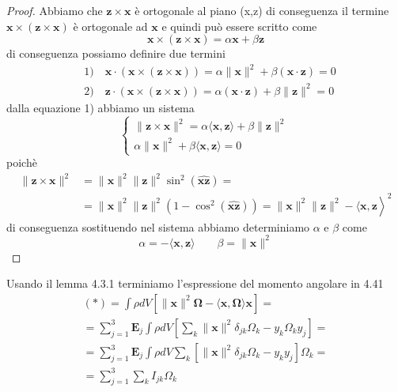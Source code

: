 \begin{proof}
	Abbiamo che $\bm{z} \times \bm{x}$ \`{e} ortogonale al piano (x,z) di conseguenza il termine $\bm{x} \times (\bm{z} \times \bm{x})$ \`{e} ortogonale ad $\bm{x}$ e quindi pu\`{o} essere scritto come 
	\begin{equation*}
	\bm{x} \times (\bm{z} \times \bm{x}) = \alpha \bm{x} + \beta \bm{z}	
	\end{equation*}
di conseguenza possiamo definire due termini 
\begin{equation*}
\begin{aligned}
& 1)\quad \bm{x} \cdot(\bm{x} \times (\bm{z} \times\bm{x}))  = \alpha\|\bm{x}\|^2+\beta(\bm{x} \cdot \bm{z})=0 \\[0.1in]
& 2)\quad \bm{z} \cdot(\bm{x} \times(\bm{z} \times\bm{x})) = \alpha(\bm{x} \cdot \bm{z})+\beta\|\bm{z}\|^2 = 0
\end{aligned}
\end{equation*}
dalla equazione 1) abbiamo un sistema 
\begin{equation*}
	\left \{ \begin{array}{l}
		\|\bm{z} \times \bm{x} \|^2 = \alpha \langle \bm{x},\bm{z}\rangle + \beta \|\bm{z}\|^2 \\[0.1in]
		\alpha \|\bm{x}\|^2 + \beta \langle \bm{x},\bm{z} \rangle = 0
	\end{array} \right.
\end{equation*}
poich\`{e} 
\begin{equation*}
\begin{aligned}
\|\bm{z} \times \bm{x}\|^2 & =\|\bm{x}\|^2\|\bm{z}\|^2 \sin ^2\left({\widehat{\bm{x}\bm{z}}}\right) = \\
& \left.=\|\bm{x}\|^2\|\bm{z}\|^2\left(1-\cos ^2(\widehat{\bm{x}\bm{z}})\right)=\|\bm{x}\|^2\|\bm{z}\|^2-\langle \bm{x}, \bm{z}\right\rangle^2
\end{aligned}
\end{equation*}
di conseguenza sostituendo nel sistema abbiamo determiniamo $\alpha $ e $\beta$ come
\begin{equation*}
	\alpha = - \langle \bm{x},\bm{z} \rangle \quad \quad \beta = \|\bm{x}\|^2
\end{equation*}
\end{proof}
\noindent Usando il lemma 4.3.1 terminiamo l'espressione del momento angolare in 4.41 
\begin{equation}
\begin{aligned}
	&(*) = \int \rho dV \left [ \|\bm{x}\|^2 \bm{\Omega} - \langle \bm{x}, \bm{\Omega} \rangle \bm{x} \right ] = & \\[0.1in] 
	&= \sum_{j=1}^{3} \bm{E}_{j} \int \rho dV \left [ \sum_{k} \|\bm{x}\|^2 \delta_{jk}\Omega_k - y_k\Omega_k y_j \right ] = \\[0.1in]
	& = \sum_{j=1}^{3} \bm{E}_{j} \int \rho dV \sum_{k} \left [ \|\bm{x}\|^2 \delta_{jk}\Omega_k - y_k y_j \right ]\Omega_k = & \\[0.1in]
	& = \sum_{j=1}^3 \sum_{k} I_{jk}\Omega_{k} 
	\end{aligned}
\end{equation}
